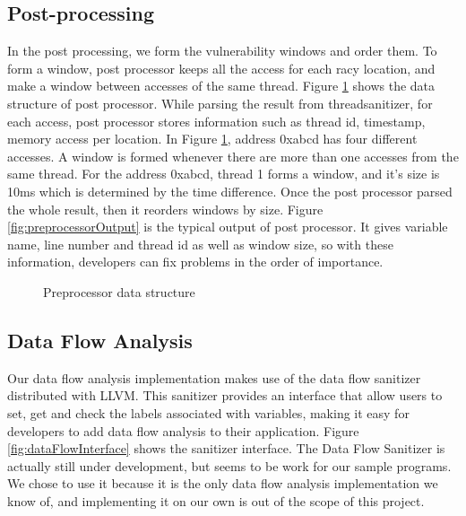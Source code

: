 \documentclass{acm_proc_article-sp}
\begin{document}
\subsection{Post-processing}

In the post processing, we form the vulnerability windows and order them. To form a window, post processor keeps all the access for each racy location, and make a window between accesses of the same thread. Figure \ref{fig:preprocessorDataStructure} shows the data structure of post processor. While parsing the result from threadsanitizer, for each access, post processor stores information such as thread id, timestamp, memory access per location. In Figure \ref{fig:preprocessorDataStructure}, address 0xabcd has four different accesses. A window is formed whenever there are more than one accesses from the same thread. For the address 0xabcd, thread 1 forms a window, and it's size is 10ms which is determined by the time difference. Once the post processor parsed the whole result, then it reorders windows by size. Figure \ref{fig:preprocessorOutput} is the typical output of post processor. It gives variable name, line number and thread id as well as window size, so with these information, developers can fix problems in the order of importance.

\begin{figure}
\centering
{}
\caption{Preprocessor data structure}
\label{fig:preprocessorDataStructure}
\end{figure}

\begin{figure*}
\centering
{}
\caption{Output of Preprocessor}
\label{fig:preprocessorOutput}
\end{figure*}


\subsection{Data Flow Analysis}

Our data flow analysis implementation makes use of the data flow sanitizer distributed with LLVM. This sanitizer provides an interface that allow users to set, get and check the labels associated with variables, making it easy for developers to add data flow analysis to their application. Figure \ref{fig:dataFlowInterface} shows the sanitizer interface. The Data Flow Sanitizer is actually still under development, but seems to be work for our sample programs. We chose to use it because it is the only data flow analysis implementation we know of, and implementing it on our own is out of the scope of this project.
\end{document}
